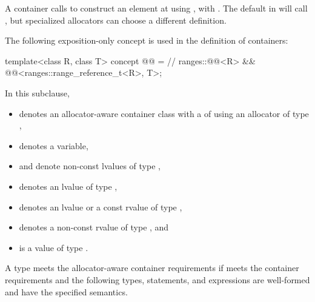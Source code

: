 \begin{note}
A container calls 
to construct an element at  using ,
with .
The default  in  will
call ,
but specialized allocators can choose a different definition.
\end{note}

\pnum
The following exposition-only concept is used in the definition of containers:
\begin{codeblock}
template<class R, class T>
concept @@ =    // \expos
  ranges::@@<R> && @@<ranges::range_reference_t<R>, T>;
\end{codeblock}

\pnum
In this subclause,
\begin{itemize}
\item
{} denotes an allocator-aware container class
with a  of  using an allocator of type ,
\item
{} denotes a variable,
\item
{} and  denote non-const lvalues of type ,
\item
{} denotes an lvalue of type ,
\item
{} denotes an lvalue or a const rvalue of type ,
\item
{} denotes a non-const rvalue of type , and
\item
{} is a value of type .
\end{itemize}

\renewcommand{\indexcont}[1]{%
\indexlibrarymisc{#1}{allocator-aware containers}%
\indexlibrarymemberx{deque}{#1}%
\indexlibrarymemberx{forward_list}{#1}%
\indexlibrarymemberx{list}{#1}%
\indexlibrarymemberx{vector}{#1}%
\indexlibrarymemberx{map}{#1}%
\indexlibrarymemberx{set}{#1}%
\indexlibrarymemberx{multiset}{#1}%
\indexlibrarymemberx{multimap}{#1}%
\indexlibrarymemberx{unordered_map}{#1}%
\indexlibrarymemberx{unordered_set}{#1}%
\indexlibrarymemberx{unordered_multiset}{#1}%
\indexlibrarymemberx{unordered_multimap}{#1}%
}

A type  meets the allocator-aware container requirements
if  meets the container requirements and
the following types, statements, and expressions are well-formed and have
the specified semantics.

